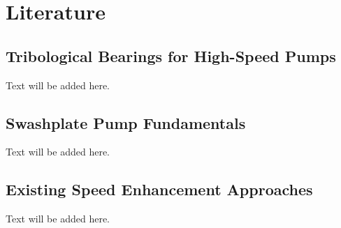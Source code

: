 {\chapter{Literature}}
\label{sec:background}

\section{Tribological Bearings for High-Speed Pumps}
Text will be added here.

\section{Swashplate Pump Fundamentals}
Text will be added here.

\section{Existing Speed Enhancement Approaches}
Text will be added here.

